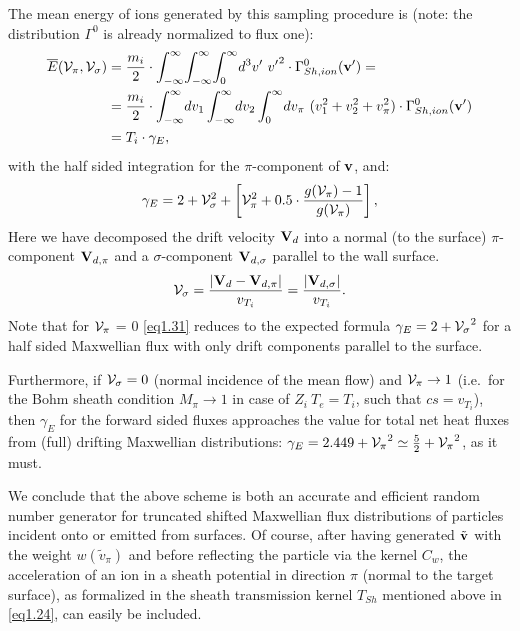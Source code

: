 The mean energy of ions generated by this sampling procedure is (note: the
distribution $\Gamma^0$ is  already normalized to flux one):
\begin{align}
  \nonumber
  \overline{E}
  ({\cal V}_{\pi},{\cal V}_{\sigma}) & = \frac{m_i}{2}	  \cdot
  \int^\infty_{-\infty} \! \int^\infty_{-\infty} \! \int^\infty_{0} \! d^3v' \
  {v'}^2	    \cdot \Gamma^0_{Sh,ion} (\mathbf{v} ' ) =                \\
                                     & = \frac{m_i}{2}	  \cdot
  \int^\infty_{-\infty} \!dv_1
  \int^\infty_{-\infty} \!dv_2 \int^\infty_{0} \!
  dv_\pi \
  (v_1^2+v_2^2+v_\pi^2)    \cdot
  \Gamma^0_{Sh,ion}
  (\mathbf{v} ' ) \label{eq1.30}
  \\
  \nonumber
                                     & = T_i	\cdot	\gamma_E,
\end{align}
with the half sided integration for the $\pi$-component of
$\mathbf{v}$, and:
\begin{equation}
  \gamma_E = 2 + {\cal V}_\sigma^2    + \left[{\cal V}_\pi^2	+   0.5
    \cdot \frac{g({\cal V}_{\pi} )  - 1}{g({\cal V}_{\pi} )}\right],
  \label{eq1.31}
\end{equation}
Here we have decomposed the drift velocity $\mathbf{V}_d$ into a normal (to the
surface) $\pi$-component $\mathbf{V}_{d,\pi}$ and a $\sigma$-component
$\mathbf{V}_{d,\sigma}$ parallel to the wall surface.
\begin{equation}{\cal V}_{\sigma} = \frac{| \mathbf{V}_d   -	\mathbf{V}_{d, \pi} |}
  {v_{T_i}} = \frac{| \mathbf{V}_{d,\sigma} |} {v_{T_i}}. \label{eq1.32}
\end{equation}
Note that for ${\cal V}_{\pi}$ = 0 \cref{eq1.31} reduces to the expected
formula $\gamma_E = 2  + {{\cal V}_{\sigma}}^2$  for a half sided Maxwellian
flux with only drift components parallel to the surface.

Furthermore, if ${\cal V}_{\sigma} = 0$ (normal incidence of the mean flow) and
${\cal V}_{\pi} \rightarrow 1$ (i.e.\ for the Bohm sheath condition $M_{\pi}
  \rightarrow 1$ in case of $Z_i~T_e = T_i$, such that $cs = v_{T_i}$), then
$\gamma_E$ for the forward sided fluxes approaches the value for total net heat
fluxes from (full) drifting Maxwellian distributions:
$\gamma_E = 2.449 + {{\cal V}_{\pi}}^2 \simeq \frac {5}{2} + {{\cal
      V}_{\pi}}^2$, as it must.

We conclude that the above scheme is both an accurate and efficient random
number generator for truncated shifted Maxwellian flux distributions of
particles incident onto or emitted from surfaces.
Of course, after having generated $ \tilde{\mathbf{v}}  $ with the weight $ w
  ({\tilde{v}}_{\pi} )$ and before reflecting the particle via the kernel $C_w $,
the acceleration of an ion in a sheath potential  in direction $\pi$ (normal to
the target surface), as formalized in the sheath transmission kernel $T_{Sh}$
mentioned above in \cref{eq1.24}, can easily be included.

